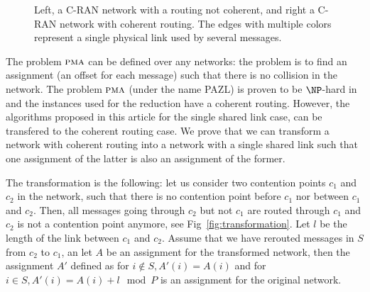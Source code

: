 \documentclass[a4paper,UKenglish,cleveref, autoref, thm-restate]{lipics-v2019}
\newcommand\pma{\textsc{pma}\xspace}
\begin{document}
\begin{figure}
\begin{center}
\begin{minipage}[c]{.45\linewidth}
{
}



\end{minipage}

 \caption{Left, a C-RAN network with a routing not coherent, and right a C-RAN network with coherent routing. The edges with multiple colors represent a single physical link used by several messages.}

\label{fig:coherent}
\end{center}
\end{figure}


The problem $\pma$ can be defined over any networks: the problem is to find an assignment (an offset for each message) such that there is no collision in the network.
The problem $\pma$ (under the name \textsc{PAZL}) is proven to be $\NP$-hard in~\cite{dominique2018deterministic} and the instances used for the reduction
have a coherent routing. However, the algorithms proposed in this article for the single shared link case, can be transfered to the
coherent routing case. We prove that we can transform a network with coherent routing into a network with a single shared link such that 
one assignment of the latter is also an assignment of the former.

The transformation is the following: let us consider two contention points $c_1$ and $c_2$ in the network, such that
there is no contention point before $c_1$ nor between $c_1$ and $c_2$. Then, all messages going through $c_2$ but not $c_1$ are 
routed through $c_1$ and $c_2$ is not a contention point anymore, see Fig~\ref{fig:transformation}. Let $l$ be the length of the link
between $c_1$ and $c_2$. Assume that we have rerouted messages in $S$ from $c_2$ to $c_1$, an let $A$ be an assignment for the transformed network,
then the assignment $A'$ defined as for $i\notin S, A'(i) = A(i)$ and for $i \in S, A'(i) = A(i) + l \mod P$ is an assignment for the original network.
\end{document}
